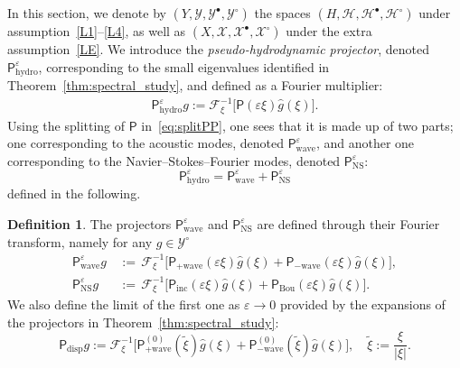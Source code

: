 \documentclass[10pt]{amsart}
\theoremstyle{definition}\newtheorem{defi}[theo]{Definition}\newtheorem{rema}[theo]{Remark}\newtheorem{exam}[theo]{Example}\newtheorem{exem}[theo]{Example}\newtheorem{nota}[theo]{Notation}
\newcommand{\ns}{\mathrm{NS}}
\newcommand{\hyd}{\mathrm{hydro}}
\newcommand{\Wave}{\mathrm{wave}}
\newcommand{\disp}{\mathrm{disp}}
\newcommand{\Inc}{\mathrm{inc}}
\newcommand{\Bou}{\mathrm{Bou}}
\newcommand{\FF}{\mathcal{F}}
\newcommand{\XX}{\mathcal{X}}
\newcommand{\HH}{\mathcal{H}}
\newcommand{\PP}{\mathsf{P}}
\newcommand{\VV}{\mathcal{Y}}
\newcommand{\Ss}{H}
\newcommand{\SSs}{\HH}
\newcommand{\SSsp}{\HH^{\bullet}}
\newcommand{\SSsm}{\HH^{\circ}}
\newcommand{\Sl}{X}
\newcommand{\SSl}{\XX}
\newcommand{\SSlp}{\XX^{\bullet}}
\newcommand{\SSlm}{\XX^{\circ}}
\newcommand{\Sg}{Y}
\newcommand{\SSg}{\VV}
\newcommand{\SSgp}{\VV^{\bullet}}
\newcommand{\SSgm}{\VV^{\circ}}
\newcommand*\eps{{\varepsilon}}
\begin{document}
In this section, we denote by $(\Sg, \SSg, \SSgp, \SSgm)$ the spaces $(\Ss, \SSs, \SSsp, \SSsm)$ under assumption~\eqref{L1}--\eqref{L4}, as well as $(\Sl, \SSl, \SSlp, \SSlm)$ under the extra assumption~\eqref{LE}. We introduce the \emph{pseudo-hydrodynamic projector}, denoted $\PP_\hyd^{\eps}$, corresponding to the small eigenvalues identified in Theorem~\ref{thm:spectral_study}, and defined as a Fourier multiplier:
\begin{gather*}
\PP_\hyd^\eps g := \FF^{-1}_\xi \Big[\PP(\eps \xi) \widehat{g}(\xi)\Big].
\end{gather*}
Using the splitting of $\PP$ in~\eqref{eq:splitPP}, one sees that it is made up of two parts; one corresponding to the acoustic modes, denoted $\PP^\eps_\Wave$, and another one corresponding to the Navier--Stokes--Fourier modes, denoted $\PP^\eps_\ns$:
\[
\PP_{\hyd}^{\eps}=\PP^{\eps}_{\Wave} + \PP^{\eps}_{\ns}
\]
defined in the following.
\begin{defi}\label{def:hydrodynamic_projectors}
The projectors $\PP_{\Wave}^{\eps}$ and $\PP_{\ns}^{\eps}$ are defined through their Fourier transform, namely for any $g \in \SSgm$
\begin{align*}
\PP_\Wave^\eps g\,&{:=}\, \FF^{-1}_{\xi} \Big[\PP_{+\Wave} (\eps \xi) \widehat{g}(\xi) + \PP_{-\Wave} (\eps \xi) \widehat{g}(\xi)\Big],\\
\PP_\ns^\eps g\,&{:=}\, \FF^{-1}_{\xi} \Big[\PP_{\Inc} (\eps \xi) \widehat{g}(\xi) + \PP_{\Bou} (\eps \xi) \widehat{g}(\xi)\Big].
\end{align*}
We also define the limit of the first one as $\eps \to 0$ provided by the expansions of the projectors in Theorem~\ref{thm:spectral_study}:
\begin{equation*}
\PP_\disp g := \FF^{-1}_{\xi} \Big[\PP_{+\Wave}^{(0)} \left(\widetilde{\xi} \right) \widehat{g}(\xi) + \PP_{-\Wave}^{(0)} \left(\widetilde{\xi} \right) \widehat{g}(\xi)\Big], \quad \widetilde{\xi} := \frac{\xi}{|\xi|}.
\end{equation*}
\end{defi}
\end{document}
